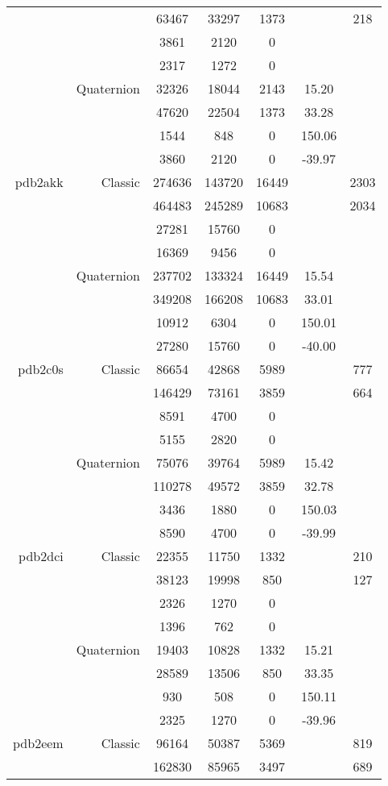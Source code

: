 \begin{xltabular}{\textwidth}{r|rcccSc}
& & 63467 & 33297 & 1373 & & 218 \\
& & 3861 & 2120 & 0 & & \\
& & 2317 & 1272 & 0 & & \\
& Quaternion & 32326 & 18044 & 2143 & 15.20 & \\
& & 47620 & 22504 & 1373 & 33.28 & \\
& & 1544 & 848 & 0 & 150.06 & \\
& & 3860 & 2120 & 0 & -39.97 & \\ \addlinespace
pdb2akk & Classic & 274636 & 143720 & 16449 & & 2303 \\
& & 464483 & 245289 & 10683 & & 2034 \\
& & 27281 & 15760 & 0 & & \\
& & 16369 & 9456 & 0 & & \\
& Quaternion & 237702 & 133324 & 16449 & 15.54 & \\
& & 349208 & 166208 & 10683 & 33.01 & \\
& & 10912 & 6304 & 0 & 150.01 & \\
& & 27280 & 15760 & 0 & -40.00 & \\ \addlinespace
pdb2c0s & Classic & 86654 & 42868 & 5989 & & 777 \\
& & 146429 & 73161 & 3859 & & 664 \\
& & 8591 & 4700 & 0 & & \\
& & 5155 & 2820 & 0 & & \\
& Quaternion & 75076 & 39764 & 5989 & 15.42 & \\
& & 110278 & 49572 & 3859 & 32.78 & \\
& & 3436 & 1880 & 0 & 150.03 & \\
& & 8590 & 4700 & 0 & -39.99 & \\ \addlinespace
pdb2dci & Classic & 22355 & 11750 & 1332 & & 210 \\
& & 38123 & 19998 & 850 & & 127 \\
& & 2326 & 1270 & 0 & & \\
& & 1396 & 762 & 0 & & \\
& Quaternion & 19403 & 10828 & 1332 & 15.21 & \\
& & 28589 & 13506 & 850 & 33.35 & \\
& & 930 & 508 & 0 & 150.11 & \\
& & 2325 & 1270 & 0 & -39.96 & \\ \addlinespace
pdb2eem & Classic & 96164 & 50387 & 5369 & & 819 \\
& & 162830 & 85965 & 3497 & & 689 \\

\end{xltabular}
